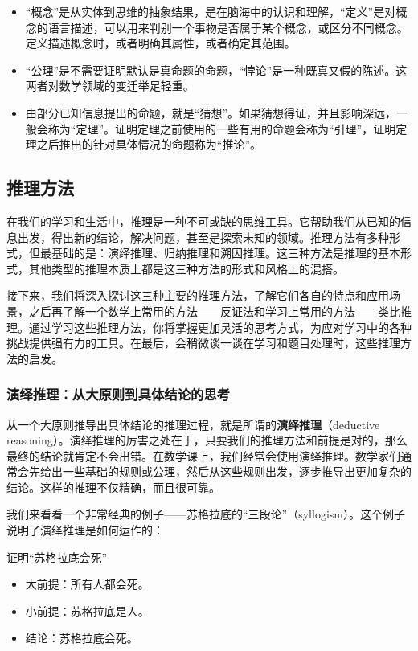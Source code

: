 \begin{itemize}
\item “概念”是从实体到思维的抽象结果，是在脑海中的认识和理解，“定义”是对概念的语言描述，可以用来判别一个事物是否属于某个概念，或区分不同概念。定义描述概念时，或者明确其属性，或者确定其范围。
\item “公理”是不需要证明默认是真命题的命题，“悖论”是一种既真又假的陈述。这两者对数学领域的变迁举足轻重。
\item 由部分已知信息提出的命题，就是“猜想”。如果猜想得证，并且影响深远，一般会称为“定理”。证明定理之前使用的一些有用的命题会称为“引理”，证明定理之后推出的针对具体情况的命题称为“推论”。
\end{itemize}

\subsection{推理方法\label{sub_HsLogi_1}}

在我们的学习和生活中，推理是一种不可或缺的思维工具。它帮助我们从已知的信息出发，得出新的结论，解决问题，甚至是探索未知的领域。推理方法有多种形式，但最基础的是：演绎推理、归纳推理和溯因推理。这三种方法是推理的基本形式，其他类型的推理本质上都是这三种方法的形式和风格上的混搭。

接下来，我们将深入探讨这三种主要的推理方法，了解它们各自的特点和应用场景，之后再了解一个数学上常用的方法——反证法和学习上常用的方法——类比推理。通过学习这些推理方法，你将掌握更加灵活的思考方式，为应对学习中的各种挑战提供强有力的工具。在最后，会稍微谈一谈在学习和题目处理时，这些推理方法的启发。%

\subsubsection{演绎推理：从大原则到具体结论的思考}

从一个大原则推导出具体结论的推理过程，就是所谓的\textbf{演绎推理}（deductive reasoning）。演绎推理的厉害之处在于，只要我们的推理方法和前提是对的，那么最终的结论就肯定不会出错。在数学课上，我们经常会使用演绎推理。数学家们通常会先给出一些基础的规则或公理，然后从这些规则出发，逐步推导出更加复杂的结论。这样的推理不仅精确，而且很可靠。

我们来看看一个非常经典的例子——苏格拉底的“三段论”（syllogism）。这个例子说明了演绎推理是如何运作的：

\begin{example}{证明“苏格拉底会死”}
\begin{itemize}
\item 大前提：所有人都会死。
\item 小前提：苏格拉底是人。
\item 结论：苏格拉底会死。
\end{itemize}
\end{example}

